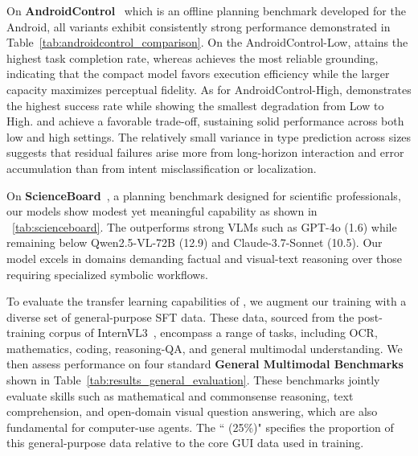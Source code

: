 On \textbf{AndroidControl}~\citep{li2024effects} which is an offline planning benchmark developed for the Android, all \modelname variants exhibit consistently strong performance demonstrated in Table~\ref{tab:androidcontrol_comparison}. On the AndroidControl-Low,  attains the highest task completion rate, whereas  achieves the most reliable grounding, indicating that the compact model favors execution efficiency while the larger capacity maximizes perceptual fidelity. As for AndroidControl-High,  demonstrates the highest success rate while showing the smallest degradation from Low to High.  and  achieve a favorable trade-off, sustaining solid performance across both low and high settings. The relatively small variance in type prediction across sizes suggests that residual failures arise more from long-horizon interaction and error accumulation than from intent misclassification or localization.

On \textbf{ScienceBoard}~\citep{sun2025scienceboard}, a planning benchmark designed for scientific professionals, our models show modest yet meaningful capability as shown in ~\ref{tab:scienceboard}. The  outperforms strong VLMs such as GPT-4o (1.6) while remaining below Qwen2.5-VL-72B (12.9) and Claude-3.7-Sonnet (10.5). Our model excels in domains demanding factual and visual-text reasoning over those requiring specialized symbolic workflows.

To evaluate the transfer learning capabilities of , we augment our training with a diverse set of general-purpose SFT data. These data, sourced from the post-training corpus of InternVL3~\citep{zhu2025internvl3}, encompass a range of tasks, including OCR, mathematics, coding, reasoning-QA, and general multimodal understanding. We then assess performance on four standard \textbf{General Multimodal Benchmarks} shown in Table~\ref{tab:results_general_evaluation}. These benchmarks jointly evaluate skills such as mathematical and commonsense reasoning, text comprehension, and open-domain visual question answering, which are also fundamental for computer-use agents. The `` (25\%)" specifies the proportion of this general-purpose data relative to the core GUI data used in training. 
% 

